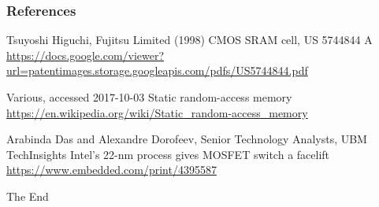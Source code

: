\documentclass{beamer}
\begin{document}
\begin{frame}
  \frametitle{References}
  \footnotesize{
    \begin{thebibliography}{99} %
     Tsuyoshi Higuchi, Fujitsu Limited (1998)
      \newblock CMOS SRAM cell, US 5744844 A
      \newblock \url{https://docs.google.com/viewer?url=patentimages.storage.googleapis.com/pdfs/US5744844.pdf}

     Various, accessed 2017-10-03
      \newblock Static random-access memory
      \newblock \url{https://en.wikipedia.org/wiki/Static_random-access_memory}

     Arabinda Das and Alexandre Dorofeev, Senior Technology Analysts, UBM TechInsights
      \newblock Intel's 22-nm process gives MOSFET switch a facelift
      \newblock \url{https://www.embedded.com/print/4395587}
    \end{thebibliography}
  }
\end{frame}
\begin{frame}
  \Huge{\centerline{The End}}
\end{frame}
\end{document}
